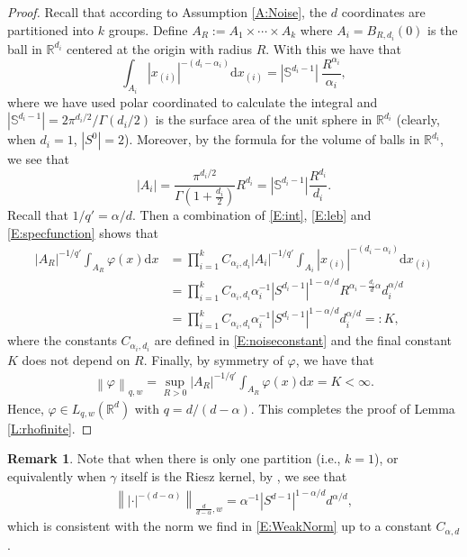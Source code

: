 \documentclass[12pt]{report}
\theoremstyle{plain}
\theoremstyle{definition}
\newtheorem{remark}[theorem]{Remark}
\numberwithin{equation}{section}
\newcommand{\R}{\mathbb{R}}
\newcommand{\Norm}[1]{\left\|  #1   \right\|}
\newcommand{\ud}{\ensuremath{ \mathrm{d} }}
\begin{document}
\begin{proof}
	Recall that according to Assumption \ref{A:Noise}, the $d$ coordinates are partitioned into $k$
	groups.  Define $A_R := A_1 \times \cdots \times A_k$ where $A_i = B_{R,d_i}(0)$ is the ball in
	$\R^{d_i}$ centered at the origin with radius $R$.  With this we have that
	\begin{equation}
	\label{E:int}
	\int_{A_i} |x_{(i)}|^{-(d_i-\alpha_i)} \ud x_{(i)}
	= |\mathbb{S}^{d_i - 1}|\: \dfrac{R^{\alpha_i}}{\alpha_i},
	\end{equation}
	where we have used polar coordinated to calculate the integral and
	$\left|\mathbb{S}^{d_i-1}\right| = 2\pi^{d_i / 2}/\Gamma(d_i/2)$ is the surface area of the unit
	sphere in $\R^{d_i}$ (clearly, when $d_i=1$,  $|S^0|=2$). Moreover, by the formula for the volume
	of balls in $\R^{d_i}$, we see that
	\begin{equation}
	\label{E:leb}
	|A_i| = \frac{\pi^{d_i /2}}{\Gamma\left(1+ \frac{d_i}{2}\right)} R^{d_i}
	= |\mathbb{S}^{d_i - 1}|\dfrac{R^{d_i}}{d_i}.
	\end{equation}
	Recall that $1/q' = \alpha/d$. Then a combination of \eqref{E:int}, \eqref{E:leb} and
	\eqref{E:specfunction} shows that
	\begin{align*}
	|A_R|^{-1/q'}  \int_{A_R} \varphi(x) \ud x
	& = \prod_{i=1}^k C_{\alpha_i,d_i} |A_i|^{-1/q'} \int_{A_i} |x_{(i)}|^{-(d_i-\alpha_i)} \ud x_{(i)}                       \\
	& = \prod_{i=1}^k C_{\alpha_i,d_i} \alpha_i^{-1}|S^{d_i-1}|^{1-\alpha/d} R^{\alpha_i- \frac{d_i}{d}\alpha} d_i^{\alpha/d} \\
	& = \prod_{i=1}^k C_{\alpha_i,d_i} \alpha_i^{-1}|S^{d_i-1}|^{1-\alpha/d} d_i^{\alpha/d} =: K,
	\end{align*}
	where the constants $C_{\alpha_i,d_i}$ are defined in \eqref{E:noiseconstant} and the final
	constant $K$ does not depend on $R$. Finally, by symmetry of $\varphi$, we have that
	\begin{align}
	\label{E:WeakNorm}
	\Norm{\varphi}_{q,w} = \sup_{R>0}  |A_R|^{-1/q'}  \int_{A_R} \varphi(x) \ud x = K < \infty.
	\end{align}
	Hence, $\varphi \in L_{q,w}(\R^d)$ with $q = d/(d-\alpha)$. This completes the proof of Lemma \ref{L:rhofinite}.
\end{proof}

\begin{remark}
	Note that when there is only one partition (i.e., $k=1$), or equivalently when $\gamma$ itself is
	the Riesz kernel, by \cite[(6) on p.  107]{lieb.loss:97:analysis}, we see that
	\begin{align*}
	\Norm{|\cdot|^{-(d-\alpha)}}_{\frac{d}{d-\alpha},w} = \alpha^{-1} |S^{d-1}|^{1-\alpha/d} d^{\alpha/d},
	\end{align*}
	which is consistent with the norm we find in \eqref{E:WeakNorm} up to a constant $C_{\alpha,d}$.
\end{remark}
\end{document}
